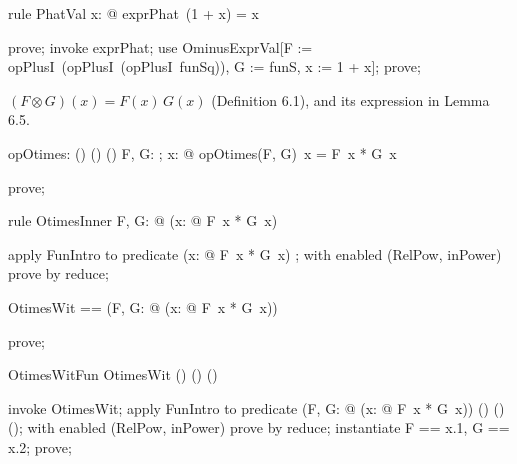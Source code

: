 \documentclass{article}
\begin{document}
\begin{theorem}{rule PhatVal}
  \forall x: \nat @ exprPhat~(1 + x) = x
\end{theorem}

\begin{zproof}
prove;
invoke exprPhat;
use OminusExprVal[F := opPlusI~(opPlusI~(opPlusI~funSq)), G := funS, x := 1 + x];
prove;
\end{zproof}

$(F \otimes G)(x) = F(x)\,G(x)$ (Definition 6.1), and its expression in Lemma 6.5.

\begin{axdef}
  opOtimes: (\nat \fun \nat) \cross (\nat \fun \nat) \fun (\nat \fun \nat)
\where
   \forall F, G: \nat \fun \nat; x: \nat @ opOtimes(F, G)~x = F~x * G~x
\end{axdef}

\begin{zproof}
prove;
\end{zproof}

\begin{theorem}{rule OtimesInner}
  \forall F, G: \nat \fun \nat @ (\lambda x: \nat @ F~x * G~x) \in \nat \fun \nat
\end{theorem}

\begin{zproof}
apply FunIntro to predicate (\lambda x: \nat @ F~x * G~x) \in \nat \fun \nat;
with enabled (RelPow, inPower) prove by reduce;
\end{zproof}

\begin{zed}
  OtimesWit == (\lambda F, G: \nat \fun \nat @ (\lambda x: \nat @ F~x * G~x))
\end{zed}

\begin{zproof}
prove;
\end{zproof}

\begin{theorem}{OtimesWitFun}
  OtimesWit \in (\nat \fun \nat) \cross (\nat \fun \nat) \fun (\nat \fun \nat)
\end{theorem}

\begin{zproof}
invoke OtimesWit;
apply FunIntro to predicate (\lambda F, G: \nat \fun \nat @ (\lambda x: \nat @ F~x * G~x)) \in (\nat \fun \nat) \cross (\nat \fun \nat) \fun (\nat \fun \nat);
with enabled (RelPow, inPower) prove by reduce;
instantiate F == x.1, G == x.2;
prove;
\end{zproof}
\end{document}
